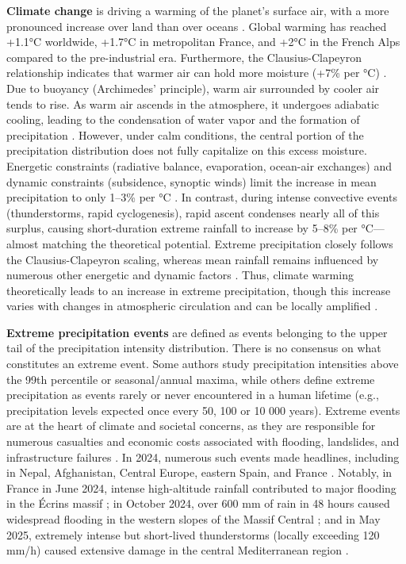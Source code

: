 \documentclass[french,a4paper,DIV=11,numbers=noendperiod]{scrartcl}
\begin{document}
\textbf{Climate change} is driving a warming of the planet's surface
air, with a more pronounced increase over land than over oceans  \parencite{IPCC2021}. Global warming has reached +1.1°C worldwide, +1.7°C in
metropolitan France, and +2°C in the French Alps compared to the
pre-industrial era. Furthermore, the Clausius-Clapeyron relationship
indicates that warmer air can hold more moisture (+7\% per °C)
\parencite{clapeyron1834}. Due to buoyancy (Archimedes' principle), warm air surrounded by cooler air tends to rise. As warm air ascends in the
atmosphere, it undergoes adiabatic cooling, leading to the condensation
of water vapor and the formation of precipitation \parencite{Lin08082022}.
However, under calm conditions, the central portion of the precipitation
distribution does not fully capitalize on this excess moisture.
Energetic constraints (radiative balance, evaporation, ocean-air
exchanges) and dynamic constraints (subsidence, synoptic winds) limit
the increase in mean precipitation to only 1--3\% per °C \parencite{IPCC2021}. In
contrast, during intense convective events (thunderstorms, rapid
cyclogenesis), rapid ascent condenses nearly all of this surplus,
causing short-duration extreme rainfall to increase by 5--8\% per
°C---almost matching the theoretical potential. Extreme precipitation
closely follows the Clausius-Clapeyron scaling, whereas mean rainfall
remains influenced by numerous other energetic and dynamic factors
\parencite{ogorman2015contrasting}. Thus, climate warming theoretically leads to an
increase in extreme precipitation, though this increase varies with
changes in atmospheric circulation and can be locally amplified \parencite{blanchet2021explaining}.

\textbf{Extreme precipitation events} are defined as events belonging to the upper tail of the precipitation intensity distribution. There is no consensus
on what constitutes an extreme event. Some authors study
precipitation intensities above the 99th percentile or seasonal/annual
maxima, while others define extreme precipitation as events rarely or
never encountered in a human lifetime (e.g., precipitation levels
expected once every 50, 100 or 10 000 years). Extreme events are at the heart of climate and societal concerns, as they are responsible for numerous casualties and economic costs associated with flooding, landslides, and infrastructure failures \parencite{IPCC_2022_WGIII}.
In 2024, numerous such events made headlines,
including in Nepal, Afghanistan, Central Europe, eastern Spain, and
France \parencite{wmo2024}. Notably, in France in June
2024, intense high-altitude rainfall contributed to major flooding in
the Écrins massif \parencite{Blanc2024}; in October 2024, over 600 mm of
rain in 48 hours caused widespread flooding in the western slopes of the Massif Central
\parencite{MeteoFrance2024_episodesArdeches}; and in May 2025, extremely intense but short-lived
thunderstorms (locally exceeding 120 mm/h) caused extensive damage in
the central Mediterranean region \parencite{MeteoFrance2025}.
\end{document}

